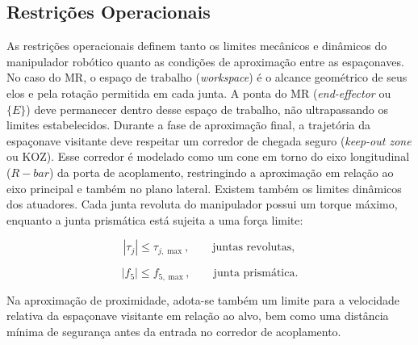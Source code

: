 \subsection{Restrições Operacionais}
\label{sec:restricoes_operacionais}

As restrições operacionais definem tanto os limites mecânicos e dinâmicos do manipulador robótico quanto as condições de aproximação entre as espaçonaves.
No caso do MR, o espaço de trabalho (\emph{workspace}) é o alcance geométrico de seus elos e pela rotação permitida em cada junta.
A ponta do MR (\emph{end-effector} ou $\{E\}$) deve permanecer dentro desse espaço de trabalho, não ultrapassando os limites estabelecidos. 
Durante a fase de aproximação final, a trajetória da espaçonave visitante deve respeitar um corredor de chegada seguro (\emph{keep-out zone} ou KOZ).
Esse corredor é modelado como um cone em torno do eixo longitudinal ($R-bar$) da porta de acoplamento, restringindo a aproximação em relação ao eixo principal e também no plano lateral.
Existem também os limites dinâmicos dos atuadores. Cada junta revoluta do manipulador possui um torque máximo, enquanto a junta prismática está sujeita a uma força limite:

\begin{equation}
\label{eq:limite_torque}
|\tau_j| \leq \tau_{j,\max}, \qquad \text{juntas revolutas},
\end{equation}

\begin{equation}
\label{eq:limite_forca}
|f_5| \leq f_{5,\max}, \qquad \text{junta prismática}.
\end{equation}

Na aproximação de proximidade, adota-se também um limite para a velocidade relativa da espaçonave visitante em relação ao alvo, bem como uma distância mínima de segurança antes da entrada no corredor de acoplamento.